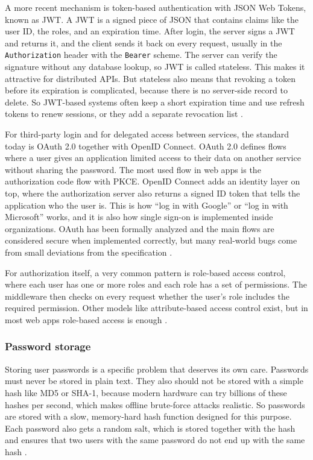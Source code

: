 A more recent mechanism is token-based authentication with JSON Web Tokens, known as JWT. A JWT is a signed piece of JSON that contains claims like the user ID, the roles, and an expiration time. After login, the server signs a JWT and returns it, and the client sends it back on every request, usually in the \texttt{Authorization} header with the \texttt{Bearer} scheme. The server can verify the signature without any database lookup, so JWT is called stateless. This makes it attractive for distributed APIs. But stateless also means that revoking a token before its expiration is complicated, because there is no server-side record to delete. So JWT-based systems often keep a short expiration time and use refresh tokens to renew sessions, or they add a separate revocation list \autocite{koziel2020rest_auth_security, chinthalapudi2025security, golla2026auth_mechanisms}.

For third-party login and for delegated access between services, the standard today is OAuth 2.0 together with OpenID Connect. OAuth 2.0 defines flows where a user gives an application limited access to their data on another service without sharing the password. The most used flow in web apps is the authorization code flow with PKCE. OpenID Connect adds an identity layer on top, where the authorization server also returns a signed ID token that tells the application who the user is. This is how \enquote{log in with Google} or \enquote{log in with Microsoft} works, and it is also how single sign-on is implemented inside organizations. OAuth has been formally analyzed and the main flows are considered secure when implemented correctly, but many real-world bugs come from small deviations from the specification \autocite{fett2016oauth_formal, golla2026auth_mechanisms, chinthalapudi2025security}.

For authorization itself, a very common pattern is role-based access control, where each user has one or more roles and each role has a set of permissions. The middleware then checks on every request whether the user's role includes the required permission. Other models like attribute-based access control exist, but in most web apps role-based access is enough \autocite{samonte2024rbac, kim2015rbac}.

\subsubsection{Password storage}
\label{sec:passwords}

Storing user passwords is a specific problem that deserves its own care. Passwords must never be stored in plain text. They also should not be stored with a simple hash like MD5 or SHA-1, because modern hardware can try billions of these hashes per second, which makes offline brute-force attacks realistic. So passwords are stored with a slow, memory-hard hash function designed for this purpose. Each password also gets a random salt, which is stored together with the hash and ensures that two users with the same password do not end up with the same hash \autocite{owasp_password_storage_2024}.

